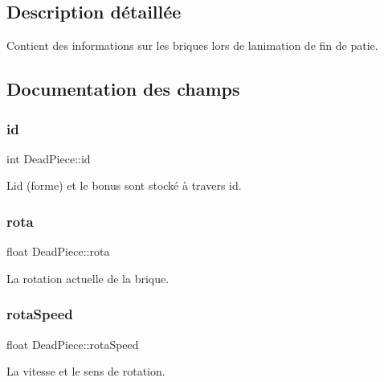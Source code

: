 \subsection{Description détaillée}
Contient des informations sur les briques lors de l\textquotesingle{}animation de fin de patie. 

\subsection{Documentation des champs}
\mbox{\label{struct_dead_piece_a3966b5734b0b309bf38ab7c22e381346}} 
\subsubsection{\texorpdfstring{id}{id}}
{\footnotesize\ttfamily int Dead\+Piece\+::id}



L\textquotesingle{}id (forme) et le bonus sont stocké à travers id. 

\mbox{\label{struct_dead_piece_a572fc55ff5cd7b10b7a9d71d8725f52d}} 
\subsubsection{\texorpdfstring{rota}{rota}}
{\footnotesize\ttfamily float Dead\+Piece\+::rota}



La rotation actuelle de la brique. 

\mbox{\label{struct_dead_piece_a5cb892f5556b4dbd28c00c4ef9ace50c}} 
\subsubsection{\texorpdfstring{rota\+Speed}{rotaSpeed}}
{\footnotesize\ttfamily float Dead\+Piece\+::rota\+Speed}



La vitesse et le sens de rotation. 

\mbox{\label{struct_dead_piece_a2651ca771e4f8d4c489fd929edf1c974}} 
